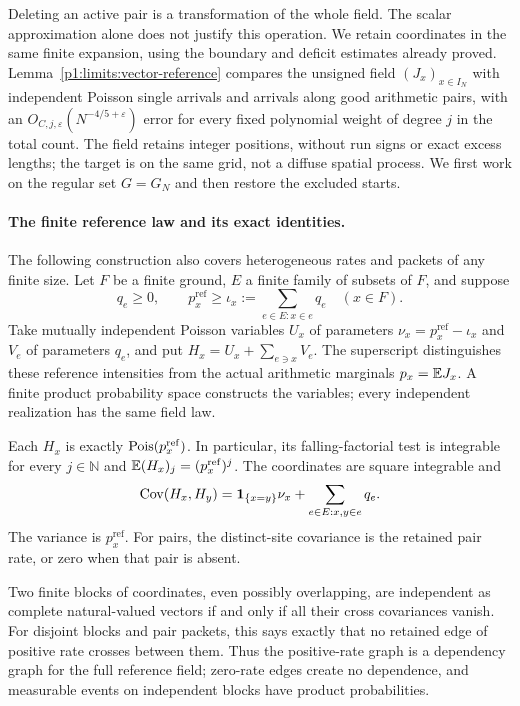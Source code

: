 Deleting an active pair is a transformation of the whole field.
The scalar approximation alone does not justify this operation.
We retain coordinates in the same finite expansion, using the
boundary and deficit estimates already proved.
Lemma~\ref{p1:limits:vector-reference} compares the unsigned
field \((J_x)_{x\in I_N}\) with independent Poisson single
arrivals and arrivals along good arithmetic pairs, with an
\(O_{C,j,\varepsilon}(N^{-4/5+\varepsilon})\) error for
every fixed polynomial weight of degree \(j\) in the total count.
The field retains integer positions, without run signs or exact
excess lengths; the target is on the same grid, not a diffuse
spatial process. We first work on the regular set \(G=G_N\)
and then restore the excluded starts.

\paragraph{The finite reference law and its exact identities.}
\label{p18:limits:reference-identities}
The following construction also covers heterogeneous rates and packets
of any finite size. Let $F$ be a finite ground, $E$ a finite family of
subsets of $F$, and suppose
\[
 q_e\ge0,\qquad
 p_x^{\mathrm{ref}}\ge\iota_x:=\sum_{e\in E:x\in e}q_e
 \quad(x\in F).
\]
Take mutually independent Poisson variables $U_x$ of parameters
$\nu_x=p_x^{\mathrm{ref}}-\iota_x$ and $V_e$ of parameters $q_e$,
and put $H_x=U_x+\sum_{e\ni x}V_e$. The superscript distinguishes
these reference intensities from the actual arithmetic marginals
$p_x=\mathbb E J_x$. A finite product probability space constructs the
variables; every independent realization has the same field law.

Each $H_x$ is exactly $\operatorname{Pois}(p_x^{\mathrm{ref}})$. In particular,
its falling-factorial test is integrable for every $j\in\mathbb N$
and $\mathbb E(H_x)_j=(p_x^{\mathrm{ref}})^j$. The coordinates are square
integrable and
\[
 \operatorname{Cov}(H_x,H_y)
  =\mathbf 1_{\{x=y\}}\nu_x+\sum_{e\in E:x,y\in e}q_e.
\]
The variance is $p_x^{\mathrm{ref}}$. For pairs, the distinct-site
covariance is the retained pair rate, or zero when that pair is absent.

Two finite blocks of coordinates, even possibly overlapping, are
independent as complete natural-valued vectors if and only if all
their cross covariances vanish. For disjoint blocks and pair packets,
this says exactly that no retained edge of positive rate crosses
between them. Thus the positive-rate graph is a dependency graph for
the full reference field; zero-rate edges create no dependence, and
measurable events on independent blocks have product probabilities.

